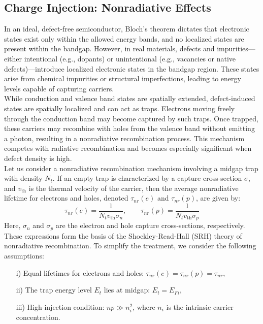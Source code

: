 \subsection{Charge Injection: Nonradiative Effects}
In an ideal, defect-free semiconductor, Bloch's theorem dictates that electronic states exist only within the allowed energy bands, and no localized states are present within the bandgap. However, in real materials, defects and impurities—either intentional (e.g., dopants) or unintentional (e.g., vacancies or native defects)—introduce localized electronic states in the bandgap region. These states arise from chemical impurities or structural imperfections, leading to energy levels capable of capturing carriers.\\
While conduction and valence band states are spatially extended, defect-induced states are spatially localized and can act as traps. Electrons moving freely through the conduction band may become captured by such traps. Once trapped, these carriers may recombine with holes from the valence band without emitting a photon, resulting in a nonradiative recombination process. This mechanism competes with radiative recombination and becomes especially significant when defect density is high.\\
Let us consider a nonradiative recombination mechanism involving a midgap trap with density \( N_t \). If an empty trap is characterized by a capture cross-section \( \sigma \), and \( v_{\text{th}} \) is the thermal velocity of the carrier, then the average nonradiative lifetime for electrons and holes, denoted \( \tau_{nr}(e) \) and \( \tau_{nr}(p) \), are given by:
\begin{equation}
	\tau_{nr}(e) = \frac{1}{N_t v_{\text{th}} \sigma_n}, \qquad
	\tau_{nr}(p) = \frac{1}{N_t v_{\text{th}} \sigma_p}
\end{equation}
Here, \( \sigma_n \) and \( \sigma_p \) are the electron and hole capture cross-sections, respectively. These expressions form the basis of the Shockley-Read-Hall (SRH) theory of nonradiative recombination.
To simplify the treatment, we consider the following assumptions:
\begin{itemize}
	\item[i)] Equal lifetimes for electrons and holes: \( \tau_{nr}(e) = \tau_{nr}(p) = \tau_{nr} \),
	\item[ii)] The trap energy level \( E_t \) lies at midgap: \( E_t = E_{Fi} \),
	\item[iii)] High-injection condition: \( np \gg n_i^2 \), where \( n_i \) is the intrinsic carrier concentration.
\end{itemize}
